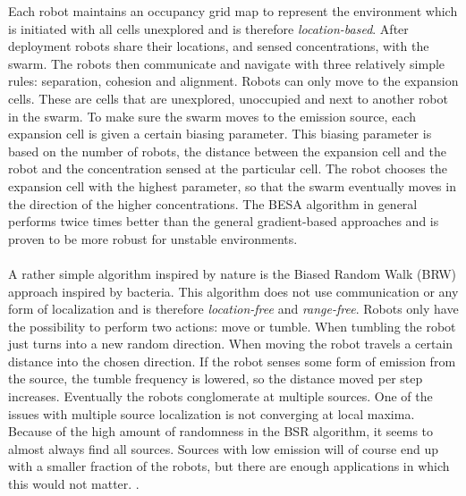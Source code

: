 		Each robot maintains an occupancy grid map to represent the environment which is initiated with all cells unexplored and is therefore \emph{location-based}.
		After deployment robots share their locations, and sensed concentrations, with the swarm.
		The robots then communicate and navigate with three relatively simple rules: separation, cohesion and alignment.
		Robots can only move to the expansion cells. 
		These are cells that are unexplored, unoccupied and next to another robot in the swarm.
		To make sure the swarm moves to the emission source, each expansion cell is given a certain biasing parameter.
		This biasing parameter is based on the number of robots, the distance between the expansion cell and the robot and the concentration sensed at the particular cell.
		The robot chooses the expansion cell with the highest parameter, so that the swarm eventually moves in the direction of the higher concentrations.
		The BESA algorithm in general performs twice times better than the general gradient-based approaches and is proven to be more robust for unstable environments. \cite{cui2004swarm}
		\\ \\
		A rather simple algorithm inspired by nature is the Biased Random Walk (BRW) approach inspired by bacteria.
		This algorithm does not use communication or any form of localization and is therefore \emph{location-free} and \emph{range-free}.
		Robots only have the possibility to perform two actions: move or tumble. 
		When tumbling the robot just turns into a new random direction. 
		When moving the robot travels a certain distance into the chosen direction. 
		If the robot senses some form of emission from the source, the tumble frequency is lowered, so the distance moved per step increases.
		Eventually the robots conglomerate at multiple sources.
		One of the issues with multiple source localization is not converging at local maxima.
		Because of the high amount of randomness in the BSR algorithm, it seems to almost always find all sources. 
		Sources with low emission will of course end up with a smaller fraction of the robots, but there are enough applications in which this would not matter. \cite{dhariwal2004bacterium}.

